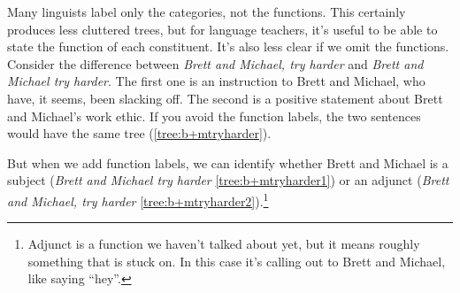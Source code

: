 Many linguists label only the categories, not the functions. This certainly produces less cluttered trees, but for language teachers, it's useful to be able to state the function of each constituent. It's also less clear if we omit the functions. Consider the difference between \textit{Brett and Michael, try harder} and \textit{Brett and Michael try harder}. The first one is an instruction to Brett and Michael, who have, it seems, been slacking off. The second is a positive statement about Brett and Michael's work ethic. If you avoid the function labels, the two sentences would have the same tree (\ref{tree:b+mtryharder}).

\ea{} \label{tree:b+mtryharder}
\z

But when we add function labels, we can identify whether Brett and Michael is a subject (\textit{Brett and Michael try harder} \ref{tree:b+mtryharder1}) or an adjunct (\textit{Brett and Michael, try harder} \ref{tree:b+mtryharder2}).\footnote{Adjunct is a function we haven't talked about yet, but it means roughly something that is stuck on. In this case it's calling out to Brett and Michael, like saying ``hey''.}

